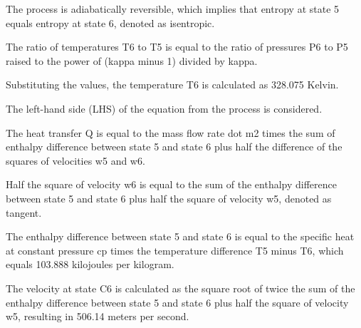The process is adiabatically reversible, which implies that entropy at state 5 equals entropy at state 6, denoted as isentropic.

The ratio of temperatures T6 to T5 is equal to the ratio of pressures P6 to P5 raised to the power of (kappa minus 1) divided by kappa.

Substituting the values, the temperature T6 is calculated as 328.075 Kelvin.

The left-hand side (LHS) of the equation from the process is considered.

The heat transfer Q is equal to the mass flow rate dot m2 times the sum of enthalpy difference between state 5 and state 6 plus half the difference of the squares of velocities w5 and w6.

Half the square of velocity w6 is equal to the sum of the enthalpy difference between state 5 and state 6 plus half the square of velocity w5, denoted as tangent.

The enthalpy difference between state 5 and state 6 is equal to the specific heat at constant pressure cp times the temperature difference T5 minus T6, which equals 103.888 kilojoules per kilogram.

The velocity at state C6 is calculated as the square root of twice the sum of the enthalpy difference between state 5 and state 6 plus half the square of velocity w5, resulting in 506.14 meters per second.